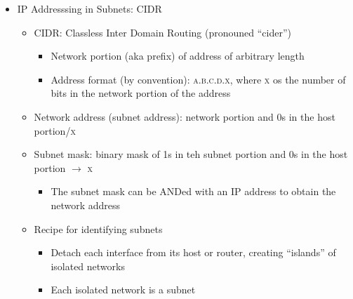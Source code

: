 \begin{itemize}
\begin{itemize}
\begin{itemize}
        \end{itemize}

    \end{itemize}

  \item IP Addresssing in Subnets: CIDR

    \begin{itemize}

      \item CIDR: Classless Inter Domain Routing (pronouned ``cider'')

        \begin{itemize}

          \item Network portion (aka prefix) of address of arbitrary length

          \item Address format (by convention): \textsc{a.b.c.d.x}, where \textsc{x} os the number of bits in the network portion of the address

        \end{itemize}

      \item Network address (subnet address): network portion and 0s in the host portion/\textsc{x}

      \item Subnet mask: binary mask of 1s in teh subnet portion and 0s in the host portion $\to$ \textsc{x}

        \begin{itemize}

          \item The subnet mask can be ANDed with an IP address to obtain the network address

        \end{itemize}

      \item Recipe for identifying subnets

        \begin{itemize}

          \item Detach each interface from its host or router, creating ``islands'' of isolated networks

          \item Each isolated network is a subnet

        \end{itemize}

    \end{itemize}


\end{itemize}
